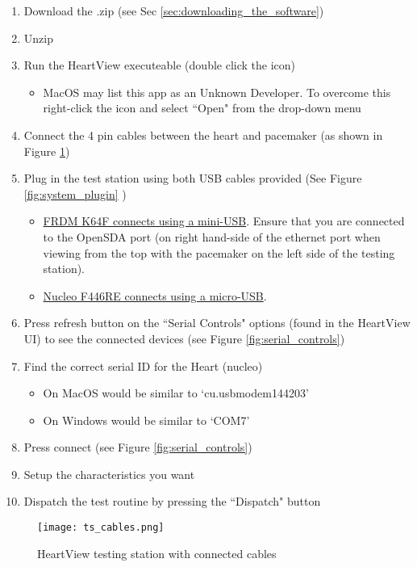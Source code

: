 \documentclass[11pt,fleqn]{book} %
\begin{document}
\begin{enumerate}
	\item Download the .zip (see Sec \ref{sec:downloading_the_software})
	\item Unzip
	\item Run the HeartView executeable (double click the icon)
		\begin{itemize}
			\item MacOS may list this app as an Unknown Developer. To overcome this right-click the icon and select ``Open" from the drop-down menu
		\end{itemize}
	\item Connect the 4 pin cables between the heart and pacemaker (as shown in Figure \ref{fig:ts_cables})
	\item Plug in the test station using both USB cables provided (See Figure \ref{fig:system_plugin} )
		\begin{itemize}
			\item \underline{FRDM K64F connects using a mini-USB}. Ensure that you are connected to the OpenSDA port (on right hand-side of the ethernet port when viewing from the top with the pacemaker on the left side of the testing station).
			\item \underline{Nucleo F446RE connects using a micro-USB}.
		\end{itemize}
	\item Press refresh button on the ``Serial Controls" options (found in the HeartView UI) to see the connected devices (see Figure \ref{fig:serial_controls})
	\item Find the correct serial ID for the Heart (nucleo)
		\begin{itemize}
			\item On MacOS would be similar to `cu.usbmodem144203'
			\item On Windows would be similar to `COM7'
		\end{itemize}
	\item Press connect (see Figure \ref{fig:serial_controls})
	\item Setup the characteristics you want
	\item Dispatch the test routine by pressing the ``Dispatch" button
\end{enumerate}

\begin{figure}[h]
	\centering\texttt{[image: ts\_cables.png]}
	\caption{HeartView testing station with connected cables}
	\label{fig:ts_cables} %
\end{figure}
\end{document}
